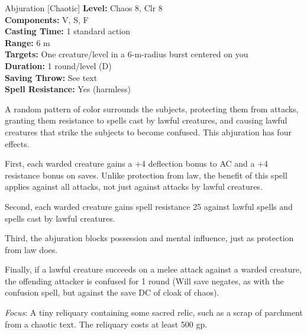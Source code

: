 {Abjuration [Chaotic]}
{
	\textbf{Level:}
	Chaos 8, Clr 8\\
	\textbf{Components:}
	V, S, F\\
	\textbf{Casting Time:}
	1 standard action\\
	\textbf{Range:}
	6 m\\
	\textbf{Targets:}
	One creature/level in a 6-m-radius burst centered on you\\
	\textbf{Duration:}
	1 round/level (D)\\
	\textbf{Saving Throw:}
	See text\\
	\textbf{Spell Resistance:}
	Yes (harmless)\\
}
{
	A random pattern of color surrounds the subjects, protecting them from attacks, granting them resistance to spells cast by lawful creatures, and causing lawful creatures that strike the subjects to become confused. This abjuration has four effects.

	First, each warded creature gains a +4 deflection bonus to AC and a +4 resistance bonus on saves. Unlike protection from law, the benefit of this spell applies against all attacks, not just against attacks by lawful creatures.

	Second, each warded creature gains spell resistance 25 against lawful spells and spells cast by lawful creatures.

	Third, the abjuration blocks possession and mental influence, just as protection from law does.

	Finally, if a lawful creature succeeds on a melee attack against a warded creature, the offending attacker is confused for 1 round (Will save negates, as with the confusion spell, but against the save DC of cloak of chaos).

	\textit{Focus}:
	A tiny reliquary containing some sacred relic, such as a scrap of parchment from a chaotic text. The reliquary costs at least 500 gp.

}
